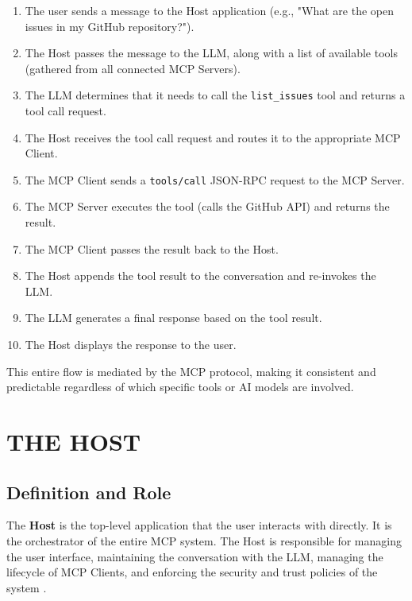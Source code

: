 \begin{enumerate}
    \item The user sends a message to the Host application (e.g., "What are the open issues in my GitHub repository?").
    \item The Host passes the message to the LLM, along with a list of available tools (gathered from all connected MCP Servers).
    \item The LLM determines that it needs to call the \texttt{list\_issues} tool and returns a tool call request.
    \item The Host receives the tool call request and routes it to the appropriate MCP Client.
    \item The MCP Client sends a \texttt{tools/call} JSON-RPC request to the MCP Server.
    \item The MCP Server executes the tool (calls the GitHub API) and returns the result.
    \item The MCP Client passes the result back to the Host.
    \item The Host appends the tool result to the conversation and re-invokes the LLM.
    \item The LLM generates a final response based on the tool result.
    \item The Host displays the response to the user.
\end{enumerate}

This entire flow is mediated by the MCP protocol, making it consistent and predictable regardless of which specific tools or AI models are involved.

\chapter{THE HOST}

\section{Definition and Role}
The \textbf{Host} is the top-level application that the user interacts with directly. It is the orchestrator of the entire MCP system. The Host is responsible for managing the user interface, maintaining the conversation with the LLM, managing the lifecycle of MCP Clients, and enforcing the security and trust policies of the system \cite{anthropic2024mcp}.

